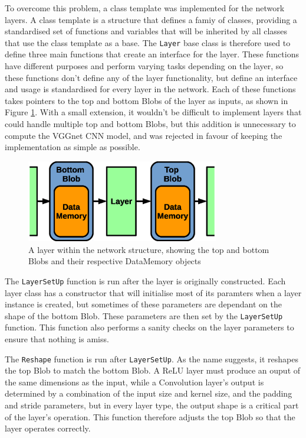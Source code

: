 \documentclass[12pt]{article}
\begin{document}
To overcome this problem, a class template was implemented for the network layers. A class template is a structure that defines a famiy of classes, providing a standardised set of functions and variables that will be inherited by all classes that use the class template as a base. The \lstinline|Layer| base class is therefore used to define three main functions that create an interface for the layer. These functions have different purposes and perform varying tasks depending on the layer, so these functions don't define any of the layer functionality, but define an interface and usage is standardised for every layer in the network. Each of these functions takes pointers to the top and bottom Blobs of the layer as inputs, as shown in Figure \ref{fig:layer}. With a small extension, it wouldn't be difficult to implement layers that could handle multiple top and bottom Blobs, but this addition is unnecessary to compute the VGGnet CNN model, and was rejected in favour of keeping the implementation as simple as possible.

\begin{figure}[h]
\centering
\includegraphics[width=0.75\textwidth]{figures/layer.eps}
\caption{A layer within the network structure, showing the top and bottom Blobs and their respective DataMemory objects}
\label{fig:layer}
\end{figure}

The \lstinline|LayerSetUp| function is run after the layer is originally constructed. Each layer class has a constructor that will initialise most of its paramters when a layer instance is created, but sometimes of these parameters are dependant on the shape of the bottom Blob. These parameters are then set by the \lstinline|LayerSetUp| function. This function also performs a sanity checks on the layer parameters to ensure that nothing is amiss.

The \lstinline|Reshape| function is run after \lstinline|LayerSetUp|. As the name suggests, it reshapes the top Blob to match the bottom Blob. A ReLU layer must produce an ouput of the same dimensions as the input, while a Convolution layer's output is determined by a combination of the input size and kernel size, and the padding and stride parameters, but in every layer type, the output shape is a critical part of the layer's operation. This function therefore adjusts the top Blob so that the layer operates correctly.
\end{document}
